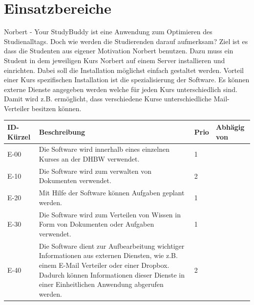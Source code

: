 
\chapter{Einsatzbereiche}
Norbert - Your StudyBuddy ist eine Anwendung zum Optimieren des Studienalltags. Doch wie werden die Studierenden darauf aufmerksam?
Ziel ist es dass die Studenten aus eigener Motivation Norbert benutzen. Dazu muss ein Student in dem jeweiligen Kurs Norbert auf einem Server installieren und einrichten.
Dabei soll die Installation möglichst einfach gestaltet werden.
Vorteil einer Kurs spezifischen Installation ist die spezialisierung der Software. Es können externe Dienste angegeben werden welche für jeden Kurs unterschiedlich sind. Damit wird z.B. ermöglicht, dass verschiedene Kurse unterschiedliche Mail-Verteiler besitzen können.

\begin{tabularx}{\textwidth}{|l|X|l|l|}
    \toprule
    \textbf{ID-Kürzel} & \textbf{Beschreibung} & \textbf{Prio} & \textbf{Abhägig von}\\
    \midrule
    \endhead
    \hline
    \caption{Einsatzbereiche}
    \label{Einsatzbereiche:tabelle}
    \endfoot
    E-00 & Die Software wird innerhalb eines einzelnen Kurses an der DHBW verwendet. & 1 & \\
    E-10 & Die Software wird zum verwalten von Dokumenten verwendet. & 2 & \\
    E-20 & Mit Hilfe der Software können Aufgaben geplant werden. & 1 & \\
    E-30 & Die Software wird zum Verteilen von Wissen in Form von Dokumenten oder Aufgaben verwendet. & 1 & \\
    E-40 & Die Software dient zur Aufbearbeitung wichtiger Informationen aus externen Diensten, wie z.B. einem E-Mail Verteiler oder einer Dropbox. Dadurch können Informationen dieser Dienste in einer Einheitlichen Anwendung abgerufen werden. & 2 & \\
\end{tabularx}


